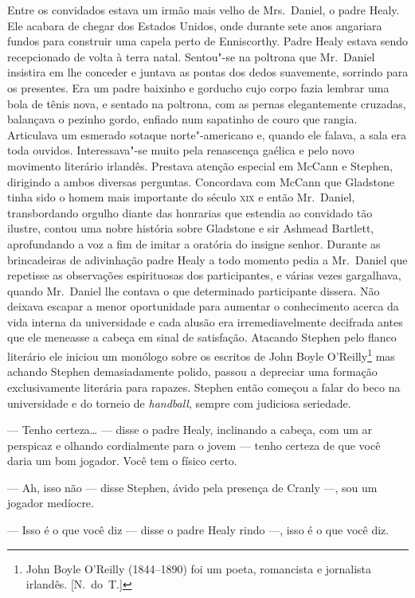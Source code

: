 Entre os convidados estava um irmão mais velho de Mrs.~Daniel, o padre Healy.
Ele acabara de chegar dos Estados Unidos, onde durante sete anos angariara
fundos para construir uma capela perto de Enniscorthy.  Padre Healy estava
sendo recepcionado de volta à terra natal.  Sentou"-se na poltrona que 
Mr.~Daniel insistira em lhe conceder e juntava as pontas dos dedos suavemente,
sorrindo para os presentes.  Era um padre baixinho e gorducho cujo corpo fazia
lembrar uma bola de tênis nova, e sentado na poltrona, com as pernas
elegantemente cruzadas, balançava o pezinho gordo, enfiado num sapatinho de
couro que rangia.  Articulava um \label{esmerado"-sotaque} esmerado sotaque norte"-americano e, quando
ele falava, a sala era toda ouvidos.  Interessava"-se muito pela renascença
gaélica e pelo novo movimento literário irlandês.  Prestava atenção especial em
McCann e Stephen, dirigindo a ambos diversas perguntas.  Concordava com McCann
que Gladstone tinha sido o homem mais importante do século \textsc{xix} e então 
Mr.~Daniel, transbordando orgulho diante das honrarias que estendia ao convidado
tão ilustre, contou uma nobre história sobre Gladstone e sir Ashmead Bartlett,
aprofundando a voz a fim de imitar a oratória do insigne senhor.  Durante as
brincadeiras de adivinhação padre Healy a todo momento pedia a Mr.~Daniel
que repetisse as observações espirituosas dos participantes, e várias vezes
gargalhava, quando Mr.~Daniel lhe contava o que determinado participante
dissera.  Não deixava escapar a menor oportunidade para aumentar o conhecimento
acerca da vida interna da universidade e cada alusão era irremediavelmente
decifrada antes que ele meneasse a cabeça em sinal de satisfação.  Atacando
Stephen pelo flanco literário ele iniciou um monólogo sobre os escritos de John
Boyle O’Reilly\footnote{ John Boyle O’Reilly (1844--1890) foi um poeta,
romancista e jornalista irlandês. [N.~do~T.]} mas achando Stephen demasiadamente
polido, passou a depreciar uma formação exclusivamente literária para rapazes.
Stephen então começou a falar do beco na universidade e do torneio de
\textit{handball}, sempre com judiciosa seriedade.

--- Tenho certeza\ldots{} --- disse o padre Healy, inclinando a cabeça, com um ar
perspicaz e olhando cordialmente para o jovem --- tenho certeza de que você
daria um bom jogador.  Você tem o físico certo.

--- Ah, isso não --- disse Stephen, ávido pela presença de Cranly ---, sou um
jogador medíocre.

--- Isso é o que você diz --- disse o padre Healy rindo ---, isso é o que você
diz.

